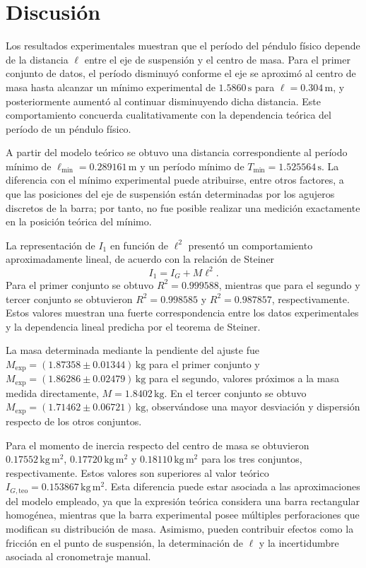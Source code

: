 \documentclass[11pt,a4paper]{article}
\begin{document}
\newpage
\section{Discusión}

Los resultados experimentales muestran que el período del péndulo físico depende de la distancia $\ell$ entre el eje de suspensión y el centro de masa. Para el primer conjunto de datos, el período disminuyó conforme el eje se aproximó al centro de masa hasta alcanzar un mínimo experimental de $1.5860\,\mathrm{s}$ para $\ell=0.304\,\mathrm{m}$, y posteriormente aumentó al continuar disminuyendo dicha distancia. Este comportamiento concuerda cualitativamente con la dependencia teórica del período de un péndulo físico.

A partir del modelo teórico se obtuvo una distancia correspondiente al período mínimo de
$\ell_{\min}=0.289161\,\mathrm{m}$ y un período mínimo de
$T_{\min}=1.525564\,\mathrm{s}$. La diferencia con el mínimo experimental puede atribuirse, entre otros factores, a que las posiciones del eje de suspensión están determinadas por los agujeros discretos de la barra; por tanto, no fue posible realizar una medición exactamente en la posición teórica del mínimo.

La representación de $I_1$ en función de $\ell^2$ presentó un comportamiento aproximadamente lineal, de acuerdo con la relación de Steiner
\[
I_1=I_G+M\ell^2.
\]
Para el primer conjunto se obtuvo $R^2=0.999588$, mientras que para el segundo y tercer conjunto se obtuvieron $R^2=0.998585$ y $R^2=0.987857$, respectivamente. Estos valores muestran una fuerte correspondencia entre los datos experimentales y la dependencia lineal predicha por el teorema de Steiner.

La masa determinada mediante la pendiente del ajuste fue
$M_{\mathrm{exp}}=(1.87358\pm0.01344)\,\mathrm{kg}$ para el primer conjunto y
$M_{\mathrm{exp}}=(1.86286\pm0.02479)\,\mathrm{kg}$ para el segundo, valores próximos a la masa medida directamente, $M=1.8402\,\mathrm{kg}$. En el tercer conjunto se obtuvo
$M_{\mathrm{exp}}=(1.71462\pm0.06721)\,\mathrm{kg}$, observándose una mayor desviación y dispersión respecto de los otros conjuntos.

Para el momento de inercia respecto del centro de masa se obtuvieron
$0.17552\,\mathrm{kg\,m^2}$,
$0.17720\,\mathrm{kg\,m^2}$ y
$0.18110\,\mathrm{kg\,m^2}$ para los tres conjuntos, respectivamente. Estos valores son superiores al valor teórico
$I_{G,\mathrm{teo}}=0.153867\,\mathrm{kg\,m^2}$. Esta diferencia puede estar asociada a las aproximaciones del modelo empleado, ya que la expresión teórica considera una barra rectangular homogénea, mientras que la barra experimental posee múltiples perforaciones que modifican su distribución de masa. Asimismo, pueden contribuir efectos como la fricción en el punto de suspensión, la determinación de $\ell$ y la incertidumbre asociada al cronometraje manual.
\end{document}
